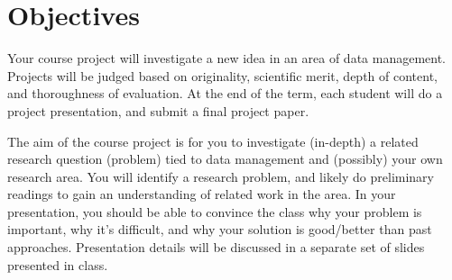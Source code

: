 \section{Objectives}

\flushleft \justifying Your course project will investigate a new idea in an area of data management. Projects will be judged
based on originality, scientific merit, depth of content, and thoroughness of evaluation. At the end of
the term, each student will do a project presentation, and submit a final project paper.

\flushleft \justifying The aim of the course project is for you to investigate (in-depth) a related research question (problem) tied to data management and (possibly) your own research area. You will identify a research problem, and likely do preliminary readings to gain an understanding of related work in the area.
In your presentation, you should be able to convince the class why your problem is important, why
it’s difficult, and why your solution is good/better than past approaches. Presentation details will be
discussed in a separate set of slides presented in class.